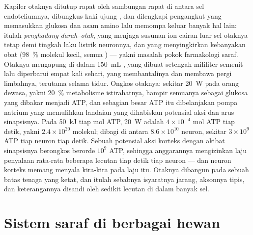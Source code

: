 \begin{proposition}\label{prop:b3:nervous-systems:barrier-budget}
Kapiler otaknya ditutup rapat oleh sambungan rapat di antara
sel endoteliumnya, dibungkus kaki ujung , dan dilengkapi
pengangkut yang memasukkan glukosa dan asam amino lalu memompa keluar
banyak hal lain: itulah \emph{penghadang darah--otak}, yang menjaga susunan
ion cairan luar sel otaknya tetap demi
tingkah laku listrik neuronnya, dan yang menyingkirkan kebanyakan obat
(\qty{98}{\%} molekul kecil, semua ) --- yakni masalah pokok
farmakologi saraf. Otaknya mengapung di dalam \qty{150}{mL}
\emph{}, yang dibuat setengah mililiter semenit lalu
diperbarui empat kali sehari, yang membantalinya dan membawa pergi limbahnya,
terutama selama tidur. Ongkos otaknya: sekitar \qty{20}{W} pada orang dewasa,
yakni \qty{20}{\%} metabolisme istirahatnya, hampir semuanya sebagai glukosa yang
dibakar menjadi ATP, dan sebagian besar ATP itu dibelanjakan pompa natrium yang
memulihkan landaian yang dihabiskan potensial aksi dan arus sinapsisnya. Pada
\qty{50}{kJ} tiap mol ATP, \qty{20}{W} adalah $4\times 10^{-4}$ mol
ATP tiap detik, yakni $2.4\times 10^{20}$ molekul; dibagi di antara
$8.6\times 10^{10}$ neuron, sekitar $3\times 10^{9}$ ATP tiap neuron tiap
detik. Sebuah potensial aksi korteks dengan akibat sinapsisnya berongkos
berorde $10^{9}$ ATP, sehingga anggarannya mengizinkan laju penyalaan
rata-rata beberapa lecutan tiap detik tiap neuron --- dan neuron korteks memang
menyala kira-kira pada laju itu. Otaknya dibangun pada sebuah batas tenaga yang
ketat, dan itulah sebabnya isyaratnya jarang, aksonnya tipis, dan
keterangannya disandi oleh sedikit lecutan di dalam banyak sel.
\end{proposition}
\admitted

\section{Sistem saraf di berbagai hewan}

